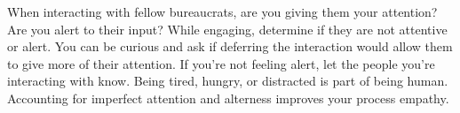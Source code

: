 When interacting with fellow bureaucrats, are you giving them your attention? Are you alert to their input? While engaging, determine if they are not attentive or alert. You can be curious and ask if deferring the interaction would allow them to give more of their attention. If you're not feeling alert, let the people you're interacting with know. Being tired, hungry, or distracted is part of being human. Accounting for imperfect attention and alterness improves your process empathy.


